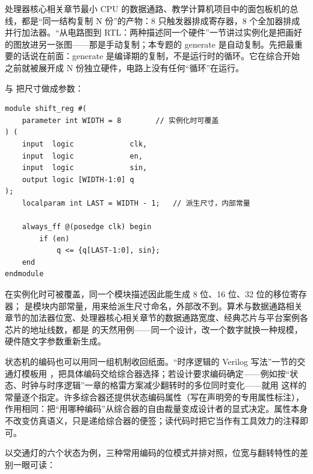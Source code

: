 
处理器核心相关章节最小 CPU 的数据通路、教学计算机项目中的面包板机的总线，都是“同一结构复制 N 份”的产物：8 只触发器排成寄存器，8 个全加器排成并行加法器。“从电路图到 RTL：两种描述同一个硬件”一节讲过实例化是把画好的图放进另一张图——那是手动复制；本专题的 generate 是自动复制。先把最重要的话说在前面：generate 是编译期的复制，不是运行时的循环。它在综合开始之前就被展开成 N 份独立硬件，电路上没有任何“循环”在运行。

 与  把尺寸做成参数：

\begin{lstlisting}
module shift_reg #(
    parameter int WIDTH = 8        // 实例化时可覆盖
) (
    input  logic             clk,
    input  logic             en,
    input  logic             sin,
    output logic [WIDTH-1:0] q
);
    localparam int LAST = WIDTH - 1;   // 派生尺寸，内部常量

    always_ff @(posedge clk) begin
        if (en)
            q <= {q[LAST-1:0], sin};
    end
endmodule
\end{lstlisting}

 在实例化时可被覆盖，同一个模块描述因此能生成 8 位、16 位、32 位的移位寄存器； 是模块内部常量，用来给派生尺寸命名，外部改不到。算术与数据通路相关章节的加法器位宽、处理器核心相关章节的数据通路宽度、经典芯片与平台案例各芯片的地址线数，都是  的天然用例——同一个设计，改一个数字就换一种规模，硬件随文字参数重新生成。

状态机的编码也可以用同一组机制收回纸面。“时序逻辑的 Verilog 写法”一节的交通灯模板用 ，把具体编码交给综合器选择；若设计要求编码确定——例如按“状态、时钟与时序逻辑”一章的格雷方案减少翻转时的多位同时变化——就用  这样的常量逐个指定。许多综合器还提供状态编码属性（写在声明旁的专用属性标注），作用相同：把“用哪种编码”从综合器的自由裁量变成设计者的显式决定。属性本身不改变仿真语义，只是递给综合器的便签；读代码时把它当作有工具效力的注释即可。

以交通灯的六个状态为例，三种常用编码的位模式并排对照，位宽与翻转特性的差别一眼可读：

